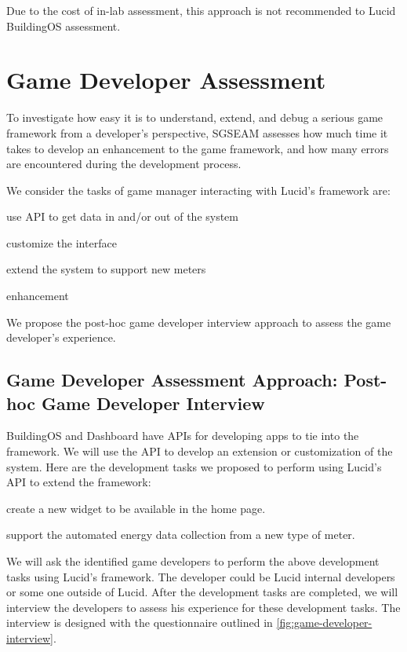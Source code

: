 \documentclass[11pt,oneside]{book}
\begin{document}
Due to the cost of in-lab assessment, this approach is not recommended to Lucid BuildingOS assessment.

\section{Game Developer Assessment}

To investigate how easy it is to understand, extend, and debug a serious game framework from a developer's 
perspective, SGSEAM assesses how much time it takes to develop an
enhancement to the game framework, and how many errors are encountered
during the development process.

We consider the tasks of game manager interacting with Lucid's framework are:

\begin{compactenum}
  \item use API to get data in and/or out of the system
  \item customize the interface
  \item extend the system to support new meters
  \item enhancement
\end{compactenum}

We propose the post-hoc game developer interview approach to assess the game developer's experience.
    
\subsection{Game Developer Assessment Approach: Post-hoc Game Developer Interview}
\label{Post-hoc game developer interview}

BuildingOS and Dashboard have APIs for developing apps to tie into the framework. We will use the API to develop an extension or customization of the system. Here are the development tasks we proposed to perform using Lucid's API to extend the framework:
\begin{compactenum}
  \item create a new widget to be available in the home page.
  \item support the automated energy data collection from a new type of meter.
\end{compactenum}

We will ask the identified game developers to perform the above development tasks using Lucid's framework. The developer could be Lucid internal developers or some one outside of Lucid.  After the development tasks are completed, we will interview the developers to assess his experience for these development tasks. The interview is designed with the questionnaire outlined in \autoref{fig:game-developer-interview}.
\end{document}
